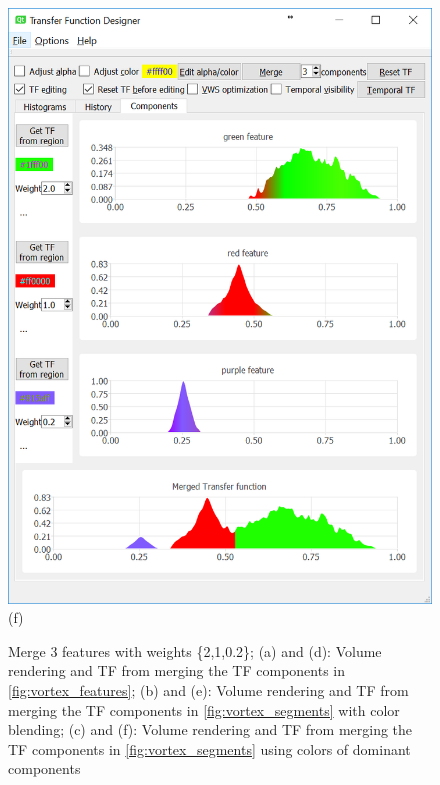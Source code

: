 \documentclass[twoside,twocolumn,10pt]{article}
\begin{document}
\begin{figure}
\begin{minipage}{.16\textwidth}
		\includegraphics[width=1\linewidth]{tf_vortex_merged_segment_green_red_purple}
		(f)
	\end{minipage}
	\caption{Merge 3 features with weights \{2,1,0.2\}; (a) and (d): Volume rendering and TF from merging the TF components in \autoref{fig:vortex_features}; (b) and (e): Volume rendering and TF from merging the TF components in \autoref{fig:vortex_segments} with color blending; (c) and (f): Volume rendering and TF from merging the TF components in \autoref{fig:vortex_segments} using colors of dominant components}
	\label{fig:vortex_merged}
\end{figure}
\end{document}
